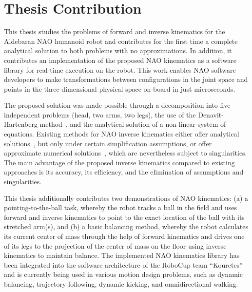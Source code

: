 \section{Thesis Contribution}
This thesis studies the problems of forward and inverse kinematics for the Aldebaran NAO humanoid robot and contributes for the first time a complete analytical solution to both problems with no approximations. In addition, it contributes an implementation of the proposed NAO kinematics as a software library for real-time execution on the robot. This work enables NAO software developers to make transformations between configurations in the joint space and points in the three-dimensional physical space on-board in just microseconds. 

The proposed solution was made possible through a decomposition into five independent problems (head, two arms, two legs), the use of the Denavit-Hartenberg method~\cite{dhparam1,dhparam2}, and the analytical solution of a non-linear system of equations. Existing methods for NAO inverse kinematics either offer analytical solutions~\cite{bhuman}, but only under certain simplification assumptions, or offer approximate numerical solutions~\cite{naopaper}, which are nevertheless subject to singularities. The main advantage of the proposed inverse kinematics compared to existing approaches is its accuracy, its efficiency, and the elimination of assumptions and singularities.   

This thesis additionally contributes two demonstrations of NAO kinematics: (a) a pointing-to-the-ball task, whereby the robot tracks a ball in the field and uses forward and inverse kinematics to point to the exact location of the ball with its stretched arm(s), and (b) a basic balancing method, whereby the robot calculates its current center of mass through the help of forward kinematics and drives one of its legs to the projection of the center of mass on the floor using inverse kinematics to maintain balance. The implemented NAO kinematics library has been integrated into the software architecture of the RoboCup team ``Kouretes'' and is currently being used in various motion design problems, such as dynamic balancing, trajectory following, dynamic kicking, and omnidirectional walking.

